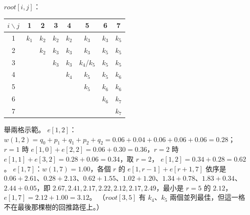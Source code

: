 \begin{pastsoln}
\textbf{$\mathit{root}[i, j]$}：
\begin{center}
\small
\begin{tabular}{c|ccccccc}
\toprule
$i \backslash j$ & 1 & 2 & 3 & 4 & 5 & 6 & 7 \\
\midrule
1 & $k_1$ & $k_2$ & $k_2$ & $k_2$ & $k_3$ & $k_3$ & $k_5$ \\
2 &  & $k_2$ & $k_3$ & $k_3$ & $k_3$ & $k_5$ & $k_5$ \\
3 &  &  & $k_3$ & $k_3$ & $k_4$/$k_5$ & $k_5$ & $k_5$ \\
4 &  &  &  & $k_4$ & $k_5$ & $k_5$ & $k_6$ \\
5 &  &  &  &  & $k_5$ & $k_6$ & $k_6$ \\
6 &  &  &  &  &  & $k_6$ & $k_7$ \\
7 &  &  &  &  &  &  & $k_7$ \\
\bottomrule
\end{tabular}
\end{center}
舉兩格示範。 $e[1, 2]$：$w(1, 2) = q_0 + p_1 + q_1 + p_2 + q_2 = 0.06 + 0.04 + 0.06 + 0.06 + 0.06 = 0.28$；$r = 1$ 時
$e[1, 0] + e[2, 2] = 0.06 + 0.30 = 0.36$，$r = 2$ 時 $e[1, 1] + e[3, 2] = 0.28 + 0.06 = 0.34$，取 $r = 2$，
$e[1, 2] = 0.34 + 0.28 = 0.62$。 $e[1, 7]$：$w(1, 7) = 1.00$，各個 $r$ 的 $e[1, r-1] + e[r+1, 7]$ 依序是
$0.06 + 2.61$、$0.28 + 2.13$、$0.62 + 1.55$、$1.02 + 1.20$、$1.34 + 0.78$、$1.83 + 0.34$、$2.44 + 0.05$，即
$2.67, 2.41, 2.17, 2.22, 2.12, 2.17, 2.49$，最小是 $r = 5$ 的 $2.12$，$e[1, 7] = 2.12 + 1.00 = 3.12$。
（$\mathit{root}[3, 5]$ 有 $k_4$、$k_5$ 兩個並列最佳，但這一格不在最後那棵樹的回推路徑上。）


\end{pastsoln}
